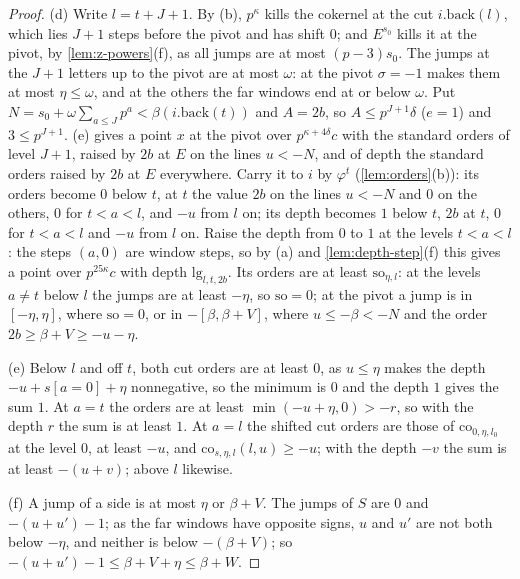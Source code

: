 \begin{proof}
(d) Write $l=t+J+1$. By (b), $p^\kappa$ kills the cokernel at the cut $i.\mathrm{back}(l)$, which lies $J+1$ steps before the pivot and has shift $0$; and $E^{s_0}$ kills it at the pivot, by \cref{lem:z-powers}(f), as all jumps are at most $(p-3)s_0$. The jumps at the $J+1$ letters up to the pivot are at most $\omega$: at the pivot
$\sigma=-1$ makes them at most $\eta\le\omega$, and at the others the far windows end at or below $\omega$. Put $N=s_0+\omega\sum_{a\le J}p^a<\beta(i.\mathrm{back}(t))$ and $A=2b$, so $A\le p^{J+1}\delta$ ($e=1$) and $3\le p^{J+1}$. (e) gives a point $x$ at the pivot over $p^{\kappa+4\delta}c$
with the standard orders of level $J+1$, raised by $2b$ at $E$ on the lines $u<-N$, and of depth the standard orders raised by $2b$ at $E$ everywhere. Carry it to $i$ by $\varphi^t$ (\cref{lem:orders}(b)): its orders become $0$ below $t$, at $t$ the value $2b$ on the lines $u<-N$ and $0$ on the others, $0$ for
$t<a<l$, and $-u$ from $l$ on; its depth becomes $1$ below $t$, $2b$ at $t$, $0$ for $t<a<l$ and $-u$ from $l$ on. Raise the depth from $0$ to $1$ at the levels $t<a<l$: the steps $(a,0)$ are window steps, so by (a) and \cref{lem:depth-step}(f) this gives a point over $p^{25\kappa}c$ with
depth $\mathrm{lg}_{l,t,2b}$. Its orders are at least $\mathrm{so}_{\eta,l}$: at the levels $a\ne t$ below $l$ the jumps are at least $-\eta$, so $\mathrm{so}=0$; at the pivot a jump is in $[-\eta,\eta]$, where $\mathrm{so}=0$, or in $-[\beta,\beta+V]$, where $u\le-\beta<-N$ and the order $2b\ge\beta+V\ge-u-\eta$.

(e) Below $l$ and off $t$, both cut orders are at least $0$, as $u\le\eta$ makes the depth $-u+s[a=0]+\eta$ nonnegative, so the minimum is $0$ and the depth $1$ gives the sum $1$. At $a=t$ the orders are at least $\min(-u+\eta,0)>-r$, so with the depth $r$ the sum is at least $1$. At $a=l$ the shifted cut
orders are those of $\mathrm{co}_{0,\eta,l_0}$ at the level $0$, at least $-u$, and $\mathrm{co}_{s,\eta,l}(l,u)\ge-u$; with the depth $-v$ the sum is at least $-(u+v)$; above $l$ likewise.

(f) A jump of a side is at most $\eta$ or $\beta+V$. The jumps of $\hat S$ are $0$ and $-(u+u')-1$; as the far windows have opposite signs, $u$ and $u'$ are not both below $-\eta$, and neither is below $-(\beta+V)$; so $-(u+u')-1\le\beta+V+\eta\le\beta+W$.
\end{proof}

